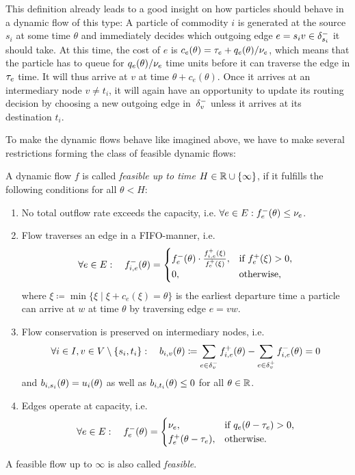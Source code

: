 This definition already leads to a good insight on how particles should behave in a dynamic flow of this type:
A particle of commodity $i$ is generated at the source $s_i$ at some time $\theta$ and immediately decides which outgoing edge $e=s_i v\in \delta^-_{s_i}$ it should take.
At this time, the cost of $e$ is $c_e(\theta) = \tau_e + q_e(\theta) / \nu_e$, which means that the particle has to queue for $q_e(\theta) / \nu_e$ time units before it can traverse the edge in $\tau_e$ time.
It will thus arrive at $v$ at time $\theta + c_e(\theta)$.
Once it arrives at an intermediary node $v\neq t_i$, it will again have an opportunity to update its routing decision by choosing a new outgoing edge in~$\delta^-_{v}$ unless it arrives at its destination $t_i$. 

To make the dynamic flows behave like imagined above, we have to make several restrictions forming the class of feasible dynamic flows:

\begin{definition}
    A dynamic flow $f$ is called \emph{feasible up to time $H\in\mathbb{R} \cup \{\infty \}$}, if it fulfills the following conditions for all $\theta < H$:
    \begin{enumerate}[label=(F\arabic*)]
        \item No total outflow rate exceeds the capacity, i.e. $\forall e\in E: {f}^-_e(\theta)\leq \nu_e$.
        \item Flow traverses an edge in a FIFO-manner, i.e. \[
            \forall e\in E: \quad 
            {f}^-_{i,e}(\theta) = \begin{cases}
                {f}^-_e(\theta) \cdot \frac{{f}^+_{i,e}(\xi)}{{f}^+_e(\xi)}, & \text{if ${f}^+_e(\xi) > 0$,}\\
                0, & \text{otherwise,}
        \end{cases}
        \]
        where $\xi\coloneqq \min \{ \xi  \mid \xi + c_e(\xi) = \theta \}$ is the earliest departure time a particle can arrive at $w$ at time $\theta$ by traversing edge $e=vw$. 
        \item Flow conservation is preserved on intermediary nodes, i.e. \[\forall i\in I, v\in V\setminus\{ s_i, t_i \}: \quad
        b_{i,v}(\theta)\coloneqq \sum_{e\in\delta^-_{v}}{f}^+_{i,e}(\theta) - \sum_{e\in\delta^+_{v}} {f}^-_{i,e}(\theta) = 0 \]
        and $b_{i,s_i}(\theta) = u_i(\theta)$ as well as $b_{i,t_i}(\theta) \leq 0$ for all $\theta\in\mathbb{R}$.

        \item Edges operate at capacity, i.e. 
        \[
            \forall e\in E: \quad {f}^-_{e}(\theta) = \begin{cases}
                \nu_e, &\text{if $q_e(\theta - \tau_e)>0$,} \\
                {f}^+_e(\theta-\tau_e), &\text{otherwise.}
            \end{cases}
        \]
    \end{enumerate}
    A feasible flow up to $\infty$ is also called \emph{feasible}.
\end{definition}
